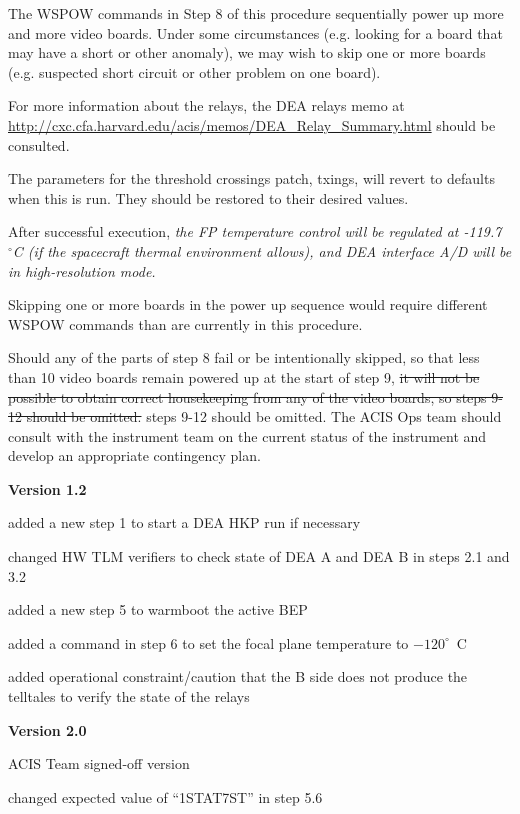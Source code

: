 \documentclass[11pt]{article}
\begin{document}
The WSPOW commands in Step 8 of this procedure sequentially power up more and more 
video boards. Under some circumstances (e.g. looking for a board that may have a 
short or other anomaly), we may wish to skip one or more boards (e.g. suspected 
short circuit or other problem on one board). 

For more information about the relays, the DEA relays memo at 
\url{http://cxc.cfa.harvard.edu/acis/memos/DEA_Relay_Summary.html} should be 
consulted.

The parameters for the threshold crossings patch, txings, will revert to defaults 
when this is run. They should be restored to their desired values.

After successful execution, {\em the FP temperature control will be regulated at 
-119.7~$^\circ$C (if the spacecraft thermal environment allows), and DEA interface 
A/D will be in high-resolution mode.}

Skipping one or more boards in the power up sequence would require different 
WSPOW commands than are currently in this procedure.

Should any of the parts of step 8 fail or be intentionally skipped, so that less 
than 10 video boards remain powered up at the start of step 9, {\color{red} 
\sout{it will not be possible to obtain correct housekeeping from any of the 
video boards, so steps 9-12 should be omitted.} steps 9-12 should be omitted. 
The ACIS Ops team should consult with the instrument team on the current status 
of the instrument and develop an appropriate contingency plan.}
\\

\newpage


\bd
\item {\bf Version 1.2}
\bi
\item added a new step 1 to start a DEA HKP run if necessary
\item changed HW TLM verifiers to check state of DEA A and DEA B in
steps 2.1 and 3.2
\item added a new step 5 to warmboot the active BEP
\item added a command in step 6 to set the focal plane temperature to
$-120^\circ$~C
\item added operational constraint/caution that the B side does not
produce the telltales to verify the state of the relays
\ei

\item {\bf Version 2.0}
\bi
\item ACIS Team signed-off version
\item changed expected value of ``1STAT7ST'' in step 5.6
\ei
\end{document}
